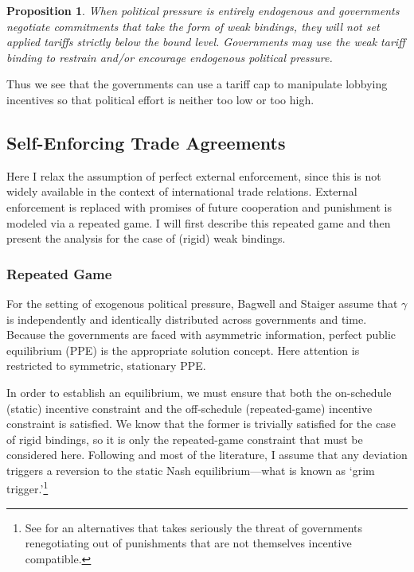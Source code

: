 \documentclass[12pt]{article}
\newtheorem{proposition}{Proposition}
\newcommand{\ga}{\gamma}
\begin{document}
\begin{proposition}
    When political pressure is entirely endogenous and governments negotiate commitments that take the form of weak bindings, they will not set applied tariffs strictly below the bound level. Governments may use the weak tariff binding to restrain and/or encourage endogenous political pressure.
		\label{res:weak}
\end{proposition}

Thus we see that the governments can use a tariff cap to manipulate lobbying incentives so that political effort is neither too low or too high.
					
	
\subsection{Self-Enforcing Trade Agreements}
\label{sec:self}
Here I relax the assumption of perfect external enforcement, since this is not widely available in the context of international trade relations. External enforcement is replaced with promises of future cooperation and punishment is modeled via a repeated game. I will first describe this repeated game and then present the analysis for the case of (rigid) weak bindings. 

\subsubsection{Repeated Game}
For the setting of exogenous political pressure, Bagwell and Staiger assume that $\ga$ is independently and identically distributed across governments and time. Because the governments are faced with asymmetric information, perfect public equilibrium (PPE) is the appropriate solution concept. Here attention is restricted to symmetric, stationary PPE.
	
In order to establish an equilibrium, we must ensure that both the on-schedule (static) incentive constraint and the off-schedule (repeated-game) incentive constraint is satisfied. We know that the former is trivially satisfied for the case of rigid bindings, so it is only the repeated-game constraint that must be considered here. Following \Textcite{bs2005} and most of the literature, I assume that any deviation triggers a reversion to the static Nash equilibrium---what is known as `grim trigger.'\footnote{See \Textcite{krw} for an alternatives that takes seriously the threat of governments renegotiating out of punishments that are not themselves incentive compatible.}
	
\end{document}
